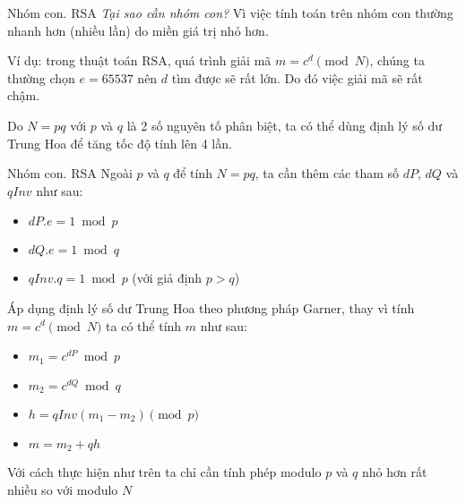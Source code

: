 \documentclass{beamer}
\begin{document}
\begin{frame}{Nhóm con. RSA}
    \textit{Tại sao cần nhóm con?} Vì việc tính toán trên nhóm con thường nhanh hơn (nhiều lần) do miền giá trị nhỏ hơn. \pause
    
    Ví dụ: trong thuật toán RSA, quá trình giải mã $m = c^d \pmod N$, chúng ta thường chọn $e=65537$ nên $d$ tìm được sẽ rất lớn. Do đó việc giải mã sẽ rất chậm. 
    
    Do $N=pq$ với $p$ và $q$ là 2 số nguyên tố phân biệt, ta có thể dùng định lý số dư Trung Hoa để tăng tốc độ tính lên 4 lần.
\end{frame}

\begin{frame}{Nhóm con. RSA}
    Ngoài $p$ và $q$ để tính $N=pq$, ta cần thêm các tham số $dP$, $dQ$ và $qInv$ như sau:
    \begin{itemize}
        \item $dP.e = 1 \bmod p$
        \item $dQ.e = 1 \bmod q$
        \item $qInv.q = 1 \bmod p$ (với giả định $p > q$)
    \end{itemize}
    \pause
    Áp dụng định lý số dư Trung Hoa theo phương pháp Garner, thay vì tính $m = c^d \pmod N$ ta có thể tính $m$ như sau:
    \begin{itemize}
        \item $m_1 = c^{dP} \bmod p$
        \item $m_2 = c^{dQ} \bmod q$
        \item $h = qInv (m_1 - m_2) \pmod p$
        \item $m = m_2 + qh$
    \end{itemize}
    Với cách thực hiện như trên ta chỉ cần tính phép modulo $p$ và $q$ nhỏ hơn rất nhiều so với modulo $N$
\end{frame}
\end{document}
